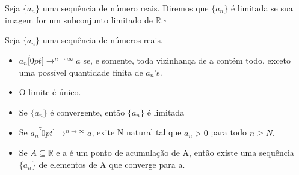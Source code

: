 \documentclass[Analysis/analysis_notes.tex]{subfiles}
\begin{document}
\begin{def*}
	Seja $\{a_{n}\}$ uma sequ\^encia de n\'umero reais. Diremos que $\{a_{n}\}$ \'e limitada se sua imagem for um subconjunto
	limitado de $\mathbb{R}.\square$
\end{def*}
\begin{theorem*}
	Seja $\{a_{n}\}$ uma sequ\^encia de n\'umeros reais.
	\begin{itemize}
		\item[a)] $a_{n}\overbracket[0pt]{\longrightarrow}^{n\rightarrow\infty}a$ se, e somente, toda vizinhan\c ca de a cont\'em todo, exceto uma poss\'ivel quantidade
		      finita de $a_{n}$'s.
		\item[b)] O limite \'e \'unico.
		\item[c)] Se $\{a_{n}\}$ \'e convergente, ent\~ao $\{a_{n}\}$ \'e limitada
		\item[d)] Se $a_{n}\overbracket[0pt]{\longrightarrow}^{n\rightarrow\infty}a$, exite N natural tal que $a_{n} > 0$ para todo $n\geq{N}.$
		\item[e)] Se $A\subseteq{\mathbb{R}}$ e a \'e um ponto de acumula\c c\~ao de A, ent\~ao existe uma sequ\^encia $\{a_{n}\}$ de elementos
		      de A que converge para a.
	\end{itemize}
\end{theorem*}
\end{document}
